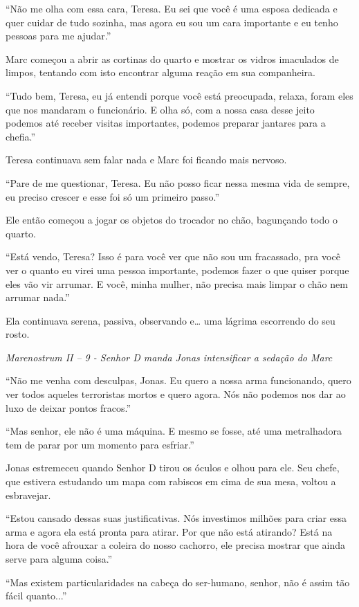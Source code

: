 ``Não me olha com essa cara, Teresa. Eu sei que você é uma esposa
dedicada e quer cuidar de tudo sozinha, mas agora eu sou um cara
importante e eu tenho pessoas para me ajudar.''

Marc começou a abrir as cortinas do quarto e mostrar os vidros
imaculados de limpos, tentando com isto encontrar alguma reação em sua
companheira.

``Tudo bem, Teresa, eu já entendi porque você está preocupada, relaxa,
foram eles que nos mandaram o funcionário. E olha só, com a nossa casa
desse jeito podemos até receber visitas importantes, podemos preparar
jantares para a chefia.''

Teresa continuava sem falar nada e Marc foi ficando mais nervoso.

``Pare de me questionar, Teresa. Eu não posso ficar nessa mesma vida de
sempre, eu preciso crescer e esse foi só um primeiro passo.''

Ele então começou a jogar os objetos do trocador no chão, bagunçando
todo o quarto.

``Está vendo, Teresa? Isso é para você ver que não sou um fracassado,
pra você ver o quanto eu virei uma pessoa importante, podemos fazer o
que quiser porque eles vão vir arrumar. E você, minha mulher, não
precisa mais limpar o chão nem arrumar nada.''

Ela continuava serena, passiva, observando e\ldots{} uma lágrima
escorrendo do seu rosto.

\asterisc

\emph{Marenostrum II -- 9 - Senhor D manda Jonas intensificar a sedação do Marc}

``Não me venha com desculpas, Jonas. Eu quero a nossa arma funcionando,
quero ver todos aqueles terroristas mortos e quero agora. Nós não
podemos nos dar ao luxo de deixar pontos fracos.''

``Mas senhor, ele não é uma máquina. E mesmo se fosse, até uma
metralhadora tem de parar por um momento para esfriar.''

Jonas estremeceu quando Senhor D tirou os óculos e olhou para ele. Seu
chefe, que estivera estudando um mapa com rabiscos em cima de sua mesa,
voltou a esbravejar.

``Estou cansado dessas suas justificativas. Nós investimos milhões para
criar essa arma e agora ela está pronta para atirar. Por que não está
atirando? Está na hora de você afrouxar a coleira do nosso cachorro, ele
precisa mostrar que ainda serve para alguma coisa.''

``Mas existem particularidades na cabeça do ser-humano, senhor, não é
assim tão fácil quanto...''

